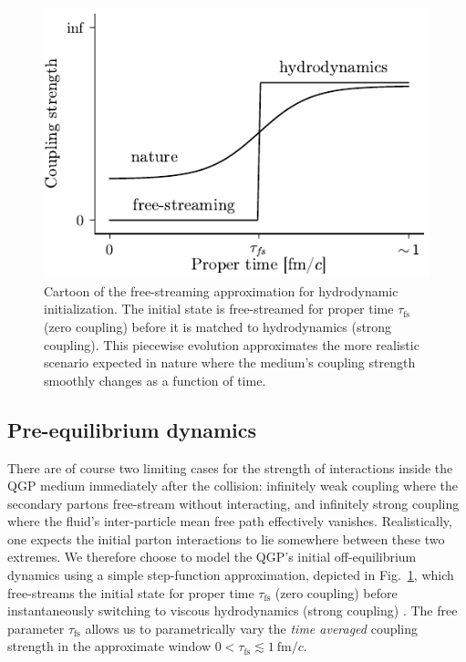 \documentclass[aps,prc,reprint,amsmath,nofootinbib]{revtex4-1}
\newcommand{\fmc}{\ensuremath{\text{fm}/c}}
\newcommand{\taufs}{\tau_\text{fs}}
\begin{document}
\begin{figure}
  \includegraphics{coupling}
  \caption{Cartoon of the free-streaming approximation for hydrodynamic initialization. The initial state is free-streamed for proper time $\taufs$ (zero coupling) before it is matched to hydrodynamics (strong coupling). This piecewise evolution approximates the more realistic scenario expected in nature where the medium's coupling strength smoothly changes as a function of time.}
  \label{fig:coupling}
\end{figure}

\subsection{Pre-equilibrium dynamics}

There are of course two limiting cases for the strength of interactions inside the QGP medium immediately after the collision: infinitely weak coupling where the secondary partons free-stream without interacting, and infinitely strong coupling where the fluid's inter-particle mean free path effectively vanishes.
Realistically, one expects the initial parton interactions to lie somewhere between these two extremes.
We therefore choose to model the QGP's initial off-equilibrium dynamics using a simple step-function approximation, depicted in Fig.~\ref{fig:coupling}, which free-streams the initial state for proper time $\taufs$ (zero coupling) before instantaneously switching to viscous hydrodynamics (strong coupling) \cite{Liu:2015nwa, Broniowski:2008qk}.
The free parameter $\taufs$ allows us to parametrically vary the \emph{time averaged} coupling strength in the approximate window $0 < \taufs \lesssim1\ \fmc$.
\end{document}
